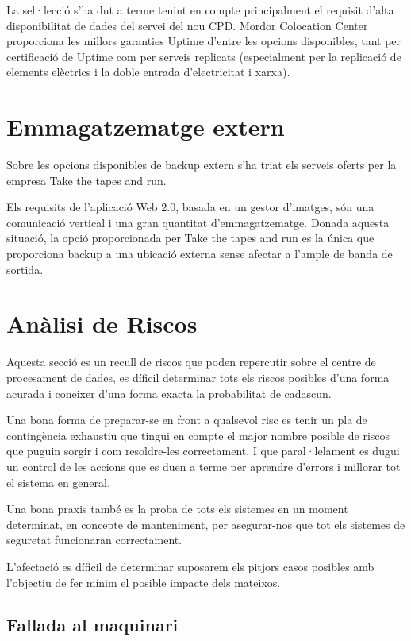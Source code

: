 \documentclass[a4paper, 11pt]{article}
\begin{document}
La sel·lecció s’ha dut a terme tenint en compte principalment el requisit d’alta disponibilitat de dades del servei del nou CPD. Mordor Colocation Center proporciona les millors garanties Uptime d’entre les opcions disponibles, tant per certificació de Uptime com per serveis replicats (especialment per la replicació de elements elèctrics i la doble entrada d’electricitat i xarxa).

\section{Emmagatzematge extern}
Sobre les opcions disponibles de backup extern s’ha triat els serveis oferts per la empresa Take the tapes and run.

Els requisits de l’aplicació Web 2.0, basada en un gestor d’imatges, són una comunicació vertical i una gran quantitat d’emmagatzematge. Donada aquesta situació, la opció proporcionada per Take the tapes and run es la única que proporciona backup a una ubicació externa sense afectar a l'ample de banda de sortida.

\section{Anàlisi de Riscos}

Aquesta secció es un recull de riscos que poden repercutir sobre el centre de procesament de dades, es díficil determinar tots els riscos posibles d'una forma acurada i coneixer d'una forma exacta la probabilitat de cadascun.

Una bona forma de preparar-se en front a qualsevol risc es tenir un pla de contingència exhaustiu que tingui en compte el major nombre posible de riscos que puguin sorgir i com resoldre-les correctament. I que paral·lelament es dugui un control de les accions que es duen a terme per aprendre d'errors i millorar tot el sistema en general. 

Una bona praxis també es la proba de tots els sistemes en un moment determinat, en concepte de manteniment, per asegurar-nos que tot els sistemes de seguretat funcionaran correctament.

L'afectació es díficil de determinar suposarem els pitjors casos posibles amb l'objectiu de fer mínim el posible impacte dels mateixos.

\subsection{Fallada al maquinari}
\end{document}
